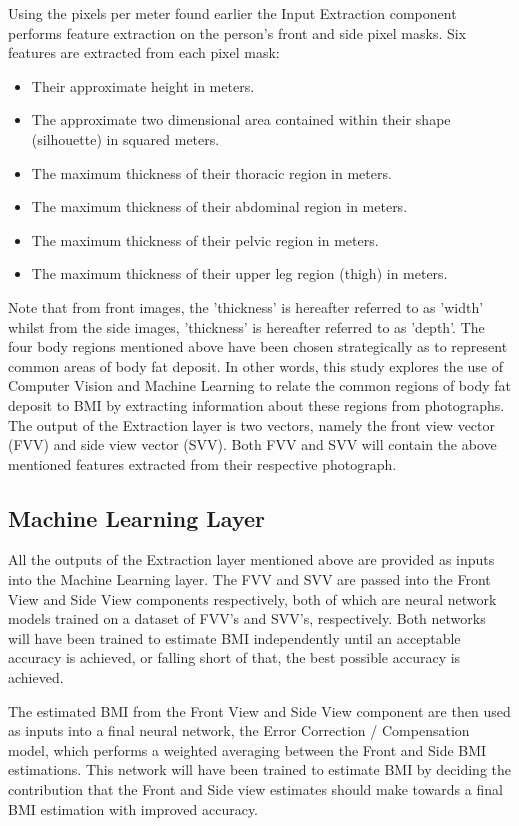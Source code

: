 \documentclass[conference]{IEEEtran}
\begin{document}
Using the pixels per meter found earlier the Input Extraction component performs feature extraction on the person's front and side pixel masks.
Six features are extracted from each pixel mask:
\begin{itemize}
	\item Their approximate height in meters.
	\item The approximate two dimensional area contained within their shape (silhouette) in squared meters.
	\item The maximum thickness of their thoracic region in meters.
	\item The maximum thickness of their abdominal region in meters.
	\item The maximum thickness of their pelvic region in meters.
	\item The maximum thickness of their upper leg region (thigh) in meters.	
\end{itemize}
Note that from front images, the 'thickness' is hereafter referred to as 'width' whilst from the side images, 'thickness' is hereafter referred to as 'depth'.
The four body regions mentioned above have been chosen strategically as to represent common areas of body fat deposit. %
In other words, this study explores the use of Computer Vision and Machine Learning to relate the common regions of body fat deposit to BMI by extracting information about these regions from photographs.
The output of the Extraction layer is two vectors, namely the front view vector (FVV) and side view vector (SVV).
Both FVV and SVV will contain the above mentioned features extracted from their respective photograph.

\subsection{Machine Learning Layer}
All the outputs of the Extraction layer mentioned above are provided as inputs into the Machine Learning layer.
The FVV and SVV are passed into the Front View and Side View components respectively, both of which are neural network models trained on a dataset of FVV's and SVV's, respectively.
Both networks will have been trained to estimate BMI independently until an acceptable accuracy is achieved, or falling short of that, the best possible accuracy is achieved.

The estimated BMI from the Front View and Side View component are then used as inputs into a final neural network, the Error Correction / Compensation model, which performs a weighted averaging between the Front and Side BMI estimations.
This network will have been trained to estimate BMI by deciding the contribution that the Front and Side view estimates should make towards a final BMI estimation with improved accuracy.
\end{document}

